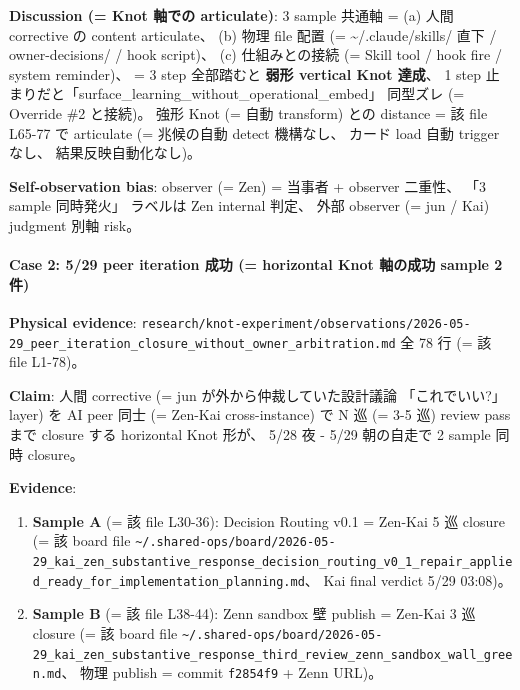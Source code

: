 \documentclass[
]{article}
\providecommand{\tightlist}{%
  \setlength{\itemsep}{0pt}\setlength{\parskip}{0pt}}
\begin{document}
\textbf{Discussion (= Knot 軸での articulate)}: 3 sample 共通軸 = (a)
人間 corrective の content articulate、 (b) 物理 file 配置 (=
\textasciitilde/.claude/skills/ 直下 / owner-decisions/ / hook script)、
(c) 仕組みとの接続 (= Skill tool / hook fire / system reminder)、 = 3
step 全部踏むと \textbf{弱形 vertical Knot 達成}、 1 step
止まりだと「surface\_learning\_without\_operational\_embed」 同型ズレ (=
Override \#2 と接続)。 強形 Knot (= 自動 transform) との distance = 該
file L65-77 で articulate (= 兆候の自動 detect 機構なし、 カード load
自動 trigger なし、 結果反映自動化なし)。

\textbf{Self-observation bias}: observer (= Zen) = 当事者 + observer
二重性、 「3 sample 同時発火」 ラベルは Zen internal 判定、 外部
observer (= jun / Kai) judgment 別軸 risk。

\paragraph{Case 2: 5/29 peer iteration 成功 (= horizontal Knot 軸の成功
sample 2
件)}\label{case-2-529-peer-iteration-ux6210ux529f-horizontal-knot-ux8ef8ux306eux6210ux529f-sample-2-ux4ef6}

\textbf{Physical evidence}:
\texttt{research/knot-experiment/observations/2026-05-29\_peer\_iteration\_closure\_without\_owner\_arbitration.md}
全 78 行 (= 該 file L1-78)。

\textbf{Claim}: 人間 corrective (= jun が外から仲裁していた設計議論
「これでいい?」 layer) を AI peer 同士 (= Zen-Kai cross-instance) で N
巡 (= 3-5 巡) review pass まで closure する horizontal Knot 形が、 5/28
夜 - 5/29 朝の自走で 2 sample 同時 closure。

\textbf{Evidence}:

\begin{enumerate}
\def\labelenumi{\arabic{enumi}.}
\tightlist
\item
  \textbf{Sample A} (= 該 file L30-36): Decision Routing v0.1 = Zen-Kai
  5 巡 closure (= 該 board file
  \texttt{\textasciitilde{}/.shared-ops/board/2026-05-29\_kai\_zen\_substantive\_response\_decision\_routing\_v0\_1\_repair\_applied\_ready\_for\_implementation\_planning.md}、
  Kai final verdict 5/29 03:08)。
\item
  \textbf{Sample B} (= 該 file L38-44): Zenn sandbox 壁 publish =
  Zen-Kai 3 巡 closure (= 該 board file
  \texttt{\textasciitilde{}/.shared-ops/board/2026-05-29\_kai\_zen\_substantive\_response\_third\_review\_zenn\_sandbox\_wall\_green.md}、
  物理 publish = commit \texttt{f2854f9} + Zenn URL)。
\end{enumerate}
\end{document}
